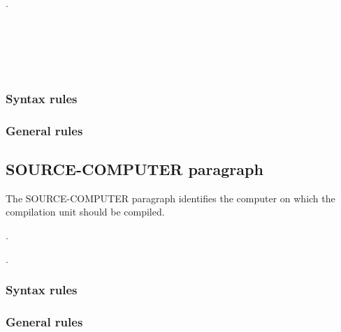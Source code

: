 
\begin{syntax}[\gnucobolcolour]
  \begin{0-1}
     .
  \end{0-1}  
  \newline
  \begin{0+}
     \\
     \\
     \\
     \\
  \end{0+}
\end{syntax}

\subsubsection{Syntax rules}

\subsubsection{General rules}

\subsection{SOURCE-COMPUTER paragraph}

The SOURCE-COMPUTER paragraph identifies the computer on which the compilation unit should be compiled.

\begin{syntax}
  .
  \begin{0-1}
    \begin{1=}
      \computername
    \end{1=}\gnucobol{\ldots}
    .
  \end{0-1}
\end{syntax}

\subsubsection{Syntax rules}

\subsubsection{General rules}

